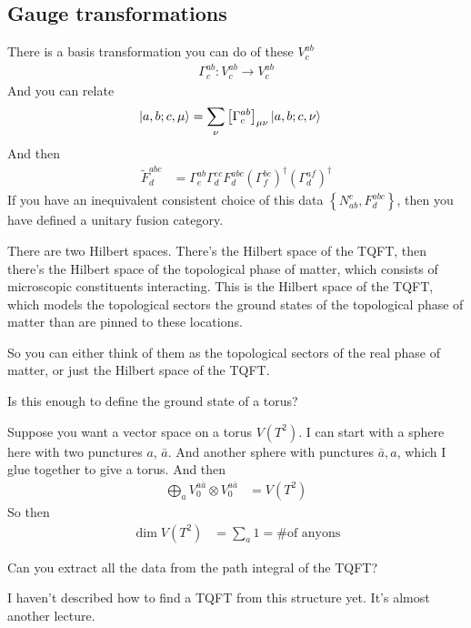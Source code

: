 \subsection{Gauge transformations}
There is a basis transformation you can do of these $V_{c}^{ab}$
\begin{align}
    \Gamma_{c}^{ab}:
    V_{c}^{ab}
    \to
    V_{c}^{ab}
\end{align}
And you can relate
\begin{align}
    \ket{a,b; c,\mu}
    &=
    \sum_{\nu}
    \left[ \Gamma_c^{ab} \right]_{\mu\nu}
    \ket{a,b;c,\nu}
\end{align}
And then
\begin{align}
    \tilde{F}_d^{abc}
    &=
    \Gamma_e^{ab}
    \Gamma_d^{ec}
    F_d^{abc}
    \left( \Gamma_f^{bc} \right)^\dagger
    \left( \Gamma_d^{af} \right)^\dagger
\end{align}
If you have an inequivalent consistent choice of this data
$\left\{ N_{ab}^{c}, F_{d}^{abc} \right\}$,
then you have defined a unitary fusion category.

There are two Hilbert spaces.
There's the Hilbert space of the TQFT,
then there's the Hilbert space of the topological phase of matter,
which consists of microscopic constituents interacting.
This is the Hilbert space of the TQFT,
which models the topological sectors the ground states of the topological phase
of matter than are pinned to these locations.

So you can either think of them as the topological sectors of the real phase of
matter,
or just the Hilbert space of the TQFT.

\begin{question}
    Is this enough to define the ground state of a torus?
\end{question}
Suppose you want a vector space on a torus $V\left( T^2 \right)$.
I can start with a sphere here
with two punctures $a$, $\bar{a}$.
And another sphere with punctures $\bar{a}, a$,
which I glue together to give a torus.
And then
\begin{align}
    \bigoplus_{a} V_{0}^{a\bar{a}}
    \otimes
    V_0^{a\bar{a}}
    &=
    V\left( T^2 \right)
\end{align}
So then
\begin{align}
    \dim V\left( T^2 \right) &=
    \sum_a 1
    = \text{\# of anyons}
\end{align}
\begin{question}
    Can you extract all the data from the path integral of the TQFT?
\end{question}
I haven't described how to find a TQFT from this structure yet.
It's almost another lecture.

